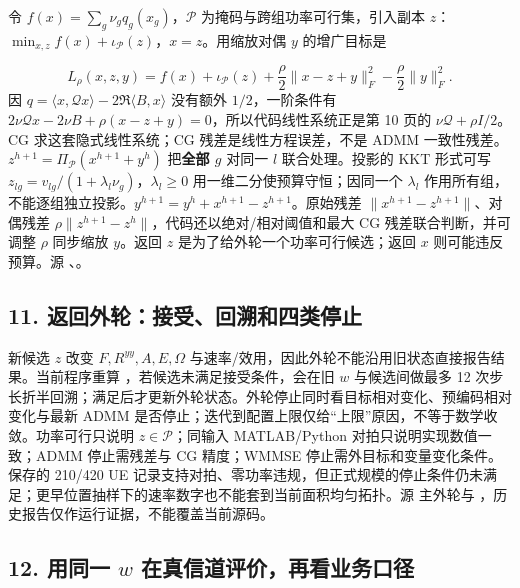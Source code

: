 \documentclass[11pt,a4paper]{ctexart}
\begin{document}
令 $f(x)=\sum_g\nu_gq_g(x_g)$，$\mathcal P$ 为掩码与跨组功率可行集，引入副本 $z$：$\min_{x,z}f(x)+\iota_{\mathcal P}(z)$，$x=z$。用缩放对偶 $y$ 的增广目标是\par
\[
L_\rho(x,z,y)=f(x)+\iota_{\mathcal P}(z)
+\frac\rho2\|x-z+y\|_F^2-\frac\rho2\|y\|_F^2.
\]
因 $q=\langle x,\mathcal Qx\rangle-2\Re\langle B,x\rangle$ 没有额外 $1/2$，一阶条件有 $2\nu\mathcal Qx-2\nu B+\rho(x-z+y)=0$，所以代码线性系统正是第 10 页的 $\nu\mathcal Q+\rho I/2$。CG 求这套隐式线性系统；CG 残差是线性方程误差，不是 ADMM 一致性残差。$z^{h+1}=\Pi_{\mathcal P}(x^{h+1}+y^h)$ 把\textbf{全部 $g$} 对同一 $l$ 联合处理。投影的 KKT 形式可写 $z_{lg}=v_{lg}/(1+\lambda_l\nu_g)$，$\lambda_l\ge0$ 用一维二分使预算守恒；因同一个 $\lambda_l$ 作用所有组，不能逐组独立投影。$y^{h+1}=y^h+x^{h+1}-z^{h+1}$。原始残差 $\|x^{h+1}-z^{h+1}\|$、对偶残差 $\rho\|z^{h+1}-z^h\|$，代码还以绝对/相对阈值和最大 CG 残差联合判断，并可调整 $\rho$ 同步缩放 $y$。返回 $z$ 是为了给外轮一个功率可行候选；返回 $x$ 则可能违反预算。源 、。\par

\subsection*{11. 返回外轮：接受、回溯和四类停止}

新候选 $z$ 改变 $F,R^{yy},A,E,\Omega$ 与速率/效用，因此外轮不能沿用旧状态直接报告结果。当前程序重算 ，若候选未满足接受条件，会在旧 $w$ 与候选间做最多 12 次步长折半回溯；满足后才更新外轮状态。外轮停止同时看目标相对变化、预编码相对变化与最新 ADMM 是否停止；迭代到配置上限仅给“上限”原因，不等于数学收敛。功率可行只说明 $z\in\mathcal P$；同输入 MATLAB/Python 对拍只说明实现数值一致；ADMM 停止需残差与 CG 精度；WMMSE 停止需外目标和变量变化条件。保存的 210/420 UE 记录支持对拍、零功率违规，但正式规模的停止条件仍未满足；更早位置抽样下的速率数字也不能套到当前面积均匀拓扑。源  主外轮与 ，历史报告仅作运行证据，不能覆盖当前源码。\par

\subsection*{12. 用同一 $w$ 在真信道评价，再看业务口径}
\end{document}
